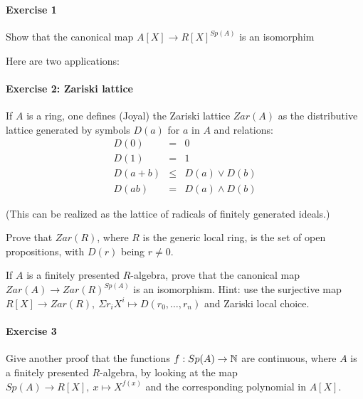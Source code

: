 \paragraph{Exercise 1}{
Show that the canonical map $A[X]\rightarrow R[X]^{Sp(A)}$ is an isomorphim
}

\medskip

 Here are two applications:

\medskip

\paragraph{Exercise 2: {\bf Zariski lattice}}{

If $A$ is a ring, one defines (Joyal) the Zariski lattice $Zar(A)$ as the distributive lattice generated
by symbols $D(a)$ for $a$ in $A$ and relations:
\begin{eqnarray}
D(0) &=& 0 \nonumber\\
D(1) &=& 1 \nonumber\\
D(a+b) &\leq& D(a)\vee D(b)\nonumber\\
D(ab) &=& D(a)\wedge D(b) \nonumber
\end{eqnarray}

(This can be realized as the lattice of radicals of finitely generated ideals.)

Prove that $Zar(R)$, where $R$ is the generic local ring, is the set of open propositions, with $D(r)$ being
$r\neq 0$.

\medskip

If $A$ is a finitely presented $R$-algebra, prove that the canonical map $Zar(A)\rightarrow Zar(R)^{Sp(A)}$
is an isomorphism. Hint: use the surjective map $R[X]\rightarrow Zar(R),~\Sigma r_iX^i\mapsto D(r_0,\dots,r_n)$
and Zariski local choice.

}


\medskip

\paragraph{Exercise 3}{
  Give another proof that the functions $f:Sp(A)\to \mathbb{N}$ are continuous, where $A$ is
 a finitely presented $R$-algebra, by looking at the map $Sp(A)\rightarrow R[X],~x\mapsto X^{f(x)}$
 and the corresponding polynomial in $A[X]$.
 }